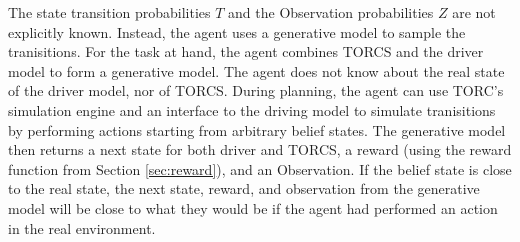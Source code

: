 The state transition probabilities $T$ and the Observation probabilities $Z$ are not explicitly known. Instead, the agent uses a generative model to sample the tranisitions. For the task at hand, the agent combines TORCS and the driver model to form a generative model. The agent does not know about the real state of the driver model, nor of TORCS. During planning, the agent can use TORC's simulation engine and an interface to the driving model to simulate tranisitions by performing actions starting from arbitrary belief states. The generative model then returns a next state for both driver and TORCS, a reward (using the reward function from Section \ref{sec:reward}), and an Observation. If the belief state is close to the real state, the next state, reward, and observation from the generative model will be close to what they would be if the agent had performed an action in the real environment.